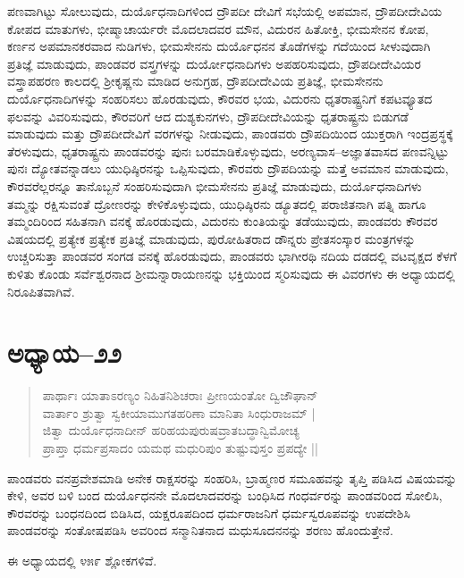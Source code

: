 ಪಣವಾಗಿಟ್ಟು ಸೋಲುವುದು, ದುರ್ಯೊಧನಾದಿಗಳಿಂದ ದ್ರೌಪದೀ ದೇವಿಗೆ ಸಭೆಯಲ್ಲಿ ಅಪಮಾನ, ದ್ರೌಪದೀದೇವಿಯ ಕೋಪದ ಮಾತುಗಳು, ಭೀಷ್ಮಾಚಾರ್ಯರೇ ಮೊದಲಾದವರ ಮೌನ, ವಿದುರನ ಹಿತೋಕ್ತಿ, ಭೀಮಸೇನನ ಕೋಪ, ಕರ್ಣನ ಅಪಮಾನಕರವಾದ ನುಡಿಗಳು, ಭೀಮಸೇನನು ದುರ್ಯೊಧನನ ತೊಡೆಗಳನ್ನು ಗದೆಯಿಂದ ಸೀಳುವುದಾಗಿ ಪ್ರತಿಜ್ಞೆ ಮಾಡುವುದು, ಪಾಂಡವರ ವಸ್ತ್ರಗಳನ್ನು ದುರ್ಯೋಧನಾದಿಗಳು ಅಪಹರಿಸುವುದು, ದ್ರೌಪದೀದೇವಿಯರ ವಸ್ತ್ರಾಪಹರಣ ಕಾಲದಲ್ಲಿ ಶ‍್ರೀಕೃಷ್ಣನು ಮಾಡಿದ ಅನುಗ್ರಹ, ದ್ರೌಪದೀದೇವಿಯ ಪ್ರತಿಜ್ಞೆ, ಭೀಮಸೇನನು ದುರ್ಯೊಧನಾದಿಗಳನ್ನು ಸಂಹರಿಸಲು ಹೊರಡುವುದು, ಕೌರವರ ಭಯ, ವಿದುರನು ಧೃತರಾಷ್ಟ್ರನಿಗೆ ಕಪಟವ್ಯೂತದ ಫಲವನ್ನು ವಿವರಿಸುವುದು, ಕೌರವರಿಗೆ ಆದ ದುಶ್ಯಕುನಗಳು, ದ್ರೌಪದೀದೇವಿಯನ್ನು ಧೃತರಾಷ್ಟ್ರನು ಬಿಡುಗಡೆ ಮಾಡುವುದು ಮತ್ತು ದ್ರೌಪದೀದೇವಿಗೆ ವರಗಳನ್ನು ನೀಡುವುದು, ಪಾಂಡವರು ದ್ರೌಪದಿಯಿಂದ ಯುಕ್ತರಾಗಿ ಇಂದ್ರಪ್ರಸ್ಥಕ್ಕೆ ತೆರಳುವುದು, ಧೃತರಾಷ್ಟ್ರನು ಪಾಂಡವರನ್ನು ಪುನಃ ಬರಮಾಡಿಕೊಳ್ಳುವುದು, ಅರಣ್ಯವಾಸ–ಅಜ್ಞಾತವಾಸದ ಪಣವನ್ನಿಟ್ಟು ಪುನಃ ದ್ಯೋತವನ್ನಾಡಲು ಯುಧಿಷ್ಠಿರನನ್ನು ಒಪ್ಪಿಸುವುದು, ಕೌರವರು ದ್ರೌಪದಿಯನ್ನು ಮತ್ತೆ ಅವಮಾನ ಮಾಡುವುದು, ಕೌರವರೆಲ್ಲರನ್ನೂ ತಾನೊಬ್ಬನೆ ಸಂಹರಿಸುವುದಾಗಿ ಭೀಮಸೇನನು ಪ್ರತಿಜ್ಞೆ ಮಾಡುವುದು, ದುರ್ಯೊಧನಾದಿಗಳು ತಮ್ಮನ್ನು ರಕ್ಷಿಸುವಂತೆ ದ್ರೋಣರನ್ನು ಕೇಳಿಕೊಳ್ಳುವುದು, ಯುಧಿಷ್ಠಿರನು ಡ್ಯೂತದಲ್ಲಿ ಪರಾಜಿತನಾಗಿ ಪತ್ನಿ ಹಾಗೂ ತಮ್ಮಂದಿರಿಂದ ಸಹಿತನಾಗಿ ವನಕ್ಕೆ ಹೊರಡುವುದು, ವಿದುರನು ಕುಂತಿಯನ್ನು ತಡೆಯುವುದು, ಪಾಂಡವರು ಕೌರವರ ವಿಷಯದಲ್ಲಿ ಪ್ರತ್ಯೇಕ ಪ್ರತ್ಯೇಕ ಪ್ರತಿಜ್ಞೆ ಮಾಡುವುದು, ಪುರೋಹಿತರಾದ ಡೌನ್ನರು ಪ್ರೇತಸಂಸ್ಕಾರ ಮಂತ್ರಗಳನ್ನು ಉಚ್ಚರಿಸುತ್ತಾ ಪಾಂಡವರ ಸಂಗಡ ವನಕ್ಕೆ ಹೊರಡುವುದು, ಪಾಂಡವರು ಭಾಗೀರಥಿ ನದಿಯ ದಡದಲ್ಲಿ ವಟವೃಕ್ಷದ ಕೆಳಗೆ ಕುಳಿತು ಕೊಂಡು ಸರ್ವೆಶ್ವರನಾದ ಶ‍್ರೀಮನ್ನಾರಾಯಣನನ್ನು ಭಕ್ತಿಯಿಂದ ಸ್ಮರಿಸುವುದು ಈ ವಿವರಗಳು ಈ ಅಧ್ಯಾಯದಲ್ಲಿ ನಿರೂಪಿತವಾಗಿವೆ.


\section{ಅಧ್ಯಾಯ–೨೨}

\begin{verse}
ಪಾರ್ಥಾಃ ಯಾತಾಽರಣ್ಯಂ ನಿಹಿತನಿಶಿಚರಾಃ ಪ್ರೀಣಯಂತೋ ದ್ವಿಜೌಘಾನ್\\ ವಾರ್ತಾಂ ಶ್ರುತ್ವಾ ಸ್ವಕೀಯಾಮುಗತಹರಿಣಾ ಮಾನಿತಾ ಸಿಂಧುರಾಜಮ್ |\\ ಜಿತ್ವಾ ದುರ್ಯೊಧನಾದೀನ್ ಹರಿಹಯಪುರುಷವ್ರಾತಬದ್ಧಾನ್ವಿಮೋಚ್ಯ\\ ಪ್ರಾಪ್ತಾ ಧರ್ಮಪ್ರಸಾದಂ ಯಮಥ ಮಧುರಿಪುಂ ತುಷ್ಟುವುಸ್ತಂ ಪ್ರಪದ್ಯೇ ||
\end{verse}

ಪಾಂಡವರು ವನಪ್ರವೇಶಮಾಡಿ ಅನೇಕ ರಾಕ್ಷಸರನ್ನು ಸಂಹರಿಸಿ, ಬ್ರಾಹ್ಮಣರ ಸಮೂಹವನ್ನು ತೃಪ್ತಿ ಪಡಿಸಿದ ವಿಷಯವನ್ನು ಕೇಳಿ, ಅವರ ಬಳಿ ಬಂದ ದುರ್ಯೊಧನನೇ ಮೊದಲಾದವರನ್ನು ಬಂಧಿಸಿದ ಗಂಧರ್ವರನ್ನು ಪಾಂಡವರಿಂದ ಸೋಲಿಸಿ, ಕೌರವರನ್ನು ಬಂಧನದಿಂದ ಬಿಡಿಸಿದ, ಯಕ್ಷರೂಪದಿಂದ ಧರ್ಮರಾಜನಿಗೆ ಧರ್ಮಸ್ವರೂಪವನ್ನು ಉಪದೇಶಿಸಿ ಪಾಂಡವರನ್ನು ಸಂತೋಷಪಡಿಸಿ ಅವರಿಂದ ಸನ್ಮಾನಿತನಾದ ಮಧುಸೂದನನನ್ನು ಶರಣು ಹೊಂದುತ್ತೇನೆ.

ಈ ಅಧ್ಯಾಯದಲ್ಲಿ ೪೫೯ ಶ್ಲೋಕಗಳಿವೆ.

